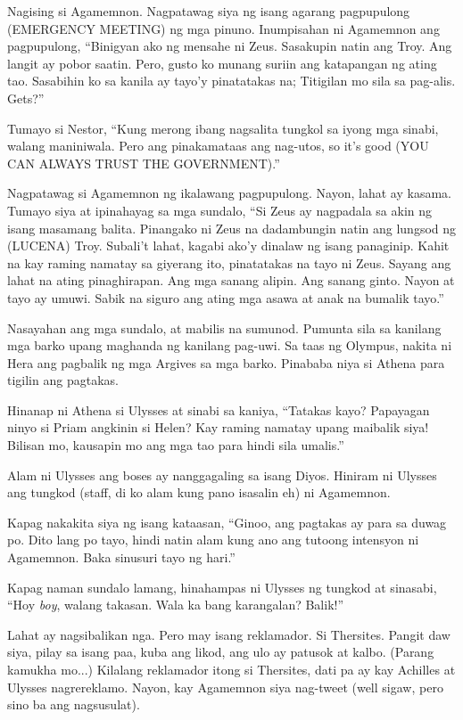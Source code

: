 \documentclass[12pt,letterpaper]{report}
\begin{document}
Nagising si Agamemnon. Nagpatawag siya ng isang agarang pagpupulong (EMERGENCY MEETING) ng mga pinuno. Inumpisahan ni Agamemnon ang pagpupulong, ``Binigyan ako ng mensahe ni Zeus. Sasakupin natin ang Troy. Ang langit ay pobor saatin. Pero, gusto ko munang suriin ang katapangan ng ating tao. Sasabihin ko sa kanila ay tayo'y pinatatakas na; Titigilan mo sila sa pag-alis. Gets?''

Tumayo si Nestor, ``Kung merong ibang nagsalita tungkol sa iyong mga sinabi, walang maniniwala. Pero ang pinakamataas ang nag-utos, so it's good (YOU CAN ALWAYS TRUST THE GOVERNMENT).''

Nagpatawag si Agamemnon ng ikalawang pagpupulong. Nayon, lahat ay kasama. Tumayo siya at ipinahayag sa mga sundalo, ``Si Zeus ay nagpadala sa akin ng isang masamang balita. Pinangako ni Zeus na dadambungin natin ang lungsod ng (LUCENA) Troy. Subali't lahat, kagabi ako'y dinalaw ng isang panaginip. Kahit na kay raming namatay sa giyerang ito, pinatatakas na tayo ni Zeus. Sayang ang lahat na ating pinaghirapan. Ang mga sanang alipin. Ang sanang ginto. Nayon at tayo ay umuwi. Sabik na siguro ang  ating mga asawa at anak na bumalik tayo.''

Nasayahan ang mga sundalo, at mabilis na sumunod. Pumunta sila sa kanilang mga barko upang maghanda ng kanilang pag-uwi. Sa taas ng Olympus, nakita ni Hera ang pagbalik ng mga Argives sa mga barko. Pinababa niya si Athena para tigilin ang pagtakas.

Hinanap ni Athena si Ulysses at sinabi sa kaniya, ``Tatakas kayo? Papayagan ninyo si Priam angkinin si Helen? Kay raming namatay upang maibalik siya! Bilisan mo, kausapin mo ang mga tao para hindi sila umalis.''

Alam ni Ulysses ang boses ay nanggagaling sa isang Diyos. Hiniram ni Ulysses ang tungkod (staff, di ko alam kung pano isasalin eh) ni Agamemnon.

Kapag nakakita siya ng isang kataasan, ``Ginoo, ang pagtakas ay para sa duwag po. Dito lang po tayo, hindi natin alam kung ano ang tutoong intensyon ni Agamemnon. Baka sinusuri tayo ng hari.''

Kapag naman sundalo lamang, hinahampas ni Ulysses ng tungkod at sinasabi, ``Hoy \textit{boy}, walang takasan. Wala ka bang karangalan? Balik!''

Lahat ay nagsibalikan nga. Pero may isang reklamador. Si Thersites. Pangit daw siya, pilay sa isang paa, kuba ang likod, ang ulo ay patusok at kalbo. (Parang kamukha mo...) Kilalang reklamador itong si Thersites, dati pa ay kay Achilles at Ulysses nagrereklamo. Nayon, kay Agamemnon siya nag-tweet (well sigaw, pero sino ba ang nagsusulat).
\end{document}
